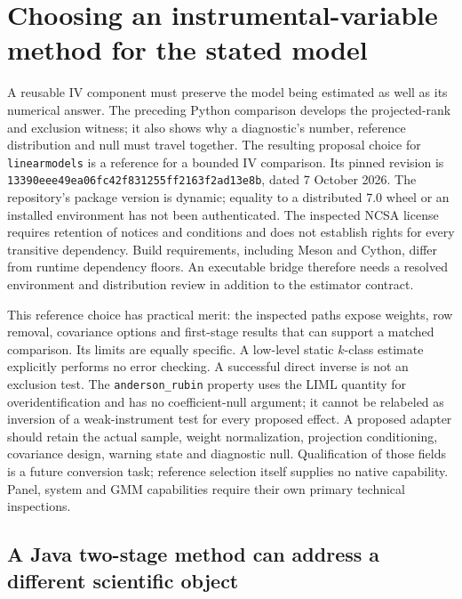 \section{Choosing an instrumental-variable method for the stated model}
\label{exec23:iv-choice}

A reusable IV component must preserve the model being estimated as well as its
numerical answer. The preceding Python comparison develops the projected-rank
and exclusion witness; it also shows why a diagnostic's number, reference
distribution and null must travel together. The resulting proposal choice for
\texttt{linearmodels} is a reference for a bounded IV comparison. Its pinned
revision is \texttt{13390eee49ea06fc42f831255ff2163f2ad13e8b}, dated
7 October 2026. The repository's package version is dynamic; equality to a
distributed 7.0 wheel or an installed environment has not been authenticated.
The inspected NCSA license requires retention of notices and conditions and
does not establish rights for every transitive dependency. Build requirements,
including Meson and Cython, differ from runtime dependency floors. An executable
bridge therefore needs a resolved environment and distribution review in
addition to the estimator contract.\citep{exec22_linearmodels_reuse}

This reference choice has practical merit: the inspected paths expose weights,
row removal, covariance options and first-stage results that can support a
matched comparison. Its limits are equally specific. A low-level static
$k$-class estimate explicitly performs no error checking. A successful direct
inverse is not an exclusion test. The \texttt{anderson\_rubin} property uses
the LIML quantity for overidentification and has no coefficient-null argument;
it cannot be relabeled as inversion of a weak-instrument test for every
proposed effect. A proposed adapter should retain the actual sample, weight
normalization, projection conditioning, covariance design, warning state and
diagnostic null. Qualification of those fields is a future conversion task;
reference selection itself supplies no native capability. Panel, system and
GMM capabilities require their own primary technical inspections.
\citep{exec22_linearmodels_reuse}

\subsection{A Java two-stage method can address a different scientific object}
\label{exec23:iv-java}

